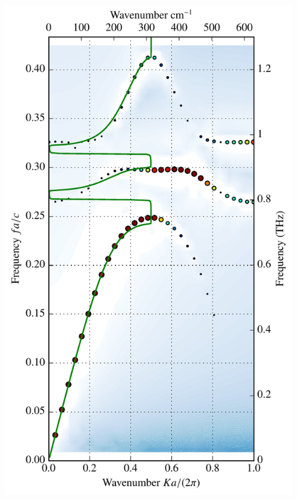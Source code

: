 \documentclass[t]{beamer} \usepackage[english]{babel} \usepackage[utf8]{inputenc} \usetheme{Frankfurt} %
\begin{document}
\begin{frame}[plain]{}
\begin{columns}[T]
\begin{column}{.55\textwidth}
	\end{column}%
	\begin{column}{.45\textwidth}%
		\vspace{-1mm}\includegraphics[height=\paperheight]{../img-cdh-new/CDH_SRRArray_08.pdf} 
	\end{column}
\end{columns}
\end{frame} 		%
\end{document}
